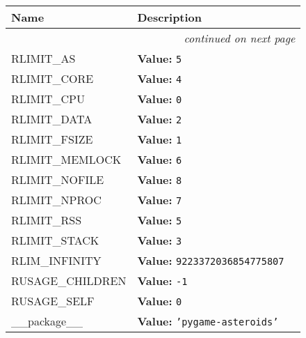     \vspace{-1cm}
\hspace{\varindent}\begin{longtable}{|p{\varnamewidth}|p{\vardescrwidth}|l}
\cline{1-2}
\cline{1-2} \centering \textbf{Name} & \centering \textbf{Description}& \\
\cline{1-2}
\endhead\cline{1-2}\multicolumn{3}{r}{\small\textit{continued on next page}}\\\endfoot\cline{1-2}
\endlastfoot\raggedright R\-L\-I\-M\-I\-T\-\_\-A\-S\- & \raggedright \textbf{Value:} 
{\tt 5}&\\
\cline{1-2}
\raggedright R\-L\-I\-M\-I\-T\-\_\-C\-O\-R\-E\- & \raggedright \textbf{Value:} 
{\tt 4}&\\
\cline{1-2}
\raggedright R\-L\-I\-M\-I\-T\-\_\-C\-P\-U\- & \raggedright \textbf{Value:} 
{\tt 0}&\\
\cline{1-2}
\raggedright R\-L\-I\-M\-I\-T\-\_\-D\-A\-T\-A\- & \raggedright \textbf{Value:} 
{\tt 2}&\\
\cline{1-2}
\raggedright R\-L\-I\-M\-I\-T\-\_\-F\-S\-I\-Z\-E\- & \raggedright \textbf{Value:} 
{\tt 1}&\\
\cline{1-2}
\raggedright R\-L\-I\-M\-I\-T\-\_\-M\-E\-M\-L\-O\-C\-K\- & \raggedright \textbf{Value:} 
{\tt 6}&\\
\cline{1-2}
\raggedright R\-L\-I\-M\-I\-T\-\_\-N\-O\-F\-I\-L\-E\- & \raggedright \textbf{Value:} 
{\tt 8}&\\
\cline{1-2}
\raggedright R\-L\-I\-M\-I\-T\-\_\-N\-P\-R\-O\-C\- & \raggedright \textbf{Value:} 
{\tt 7}&\\
\cline{1-2}
\raggedright R\-L\-I\-M\-I\-T\-\_\-R\-S\-S\- & \raggedright \textbf{Value:} 
{\tt 5}&\\
\cline{1-2}
\raggedright R\-L\-I\-M\-I\-T\-\_\-S\-T\-A\-C\-K\- & \raggedright \textbf{Value:} 
{\tt 3}&\\
\cline{1-2}
\raggedright R\-L\-I\-M\-\_\-I\-N\-F\-I\-N\-I\-T\-Y\- & \raggedright \textbf{Value:} 
{\tt 9223372036854775807}&\\
\cline{1-2}
\raggedright R\-U\-S\-A\-G\-E\-\_\-C\-H\-I\-L\-D\-R\-E\-N\- & \raggedright \textbf{Value:} 
{\tt -1}&\\
\cline{1-2}
\raggedright R\-U\-S\-A\-G\-E\-\_\-S\-E\-L\-F\- & \raggedright \textbf{Value:} 
{\tt 0}&\\
\cline{1-2}
\raggedright \_\-\_\-p\-a\-c\-k\-a\-g\-e\-\_\-\_\- & \raggedright \textbf{Value:} 
{\tt \texttt{'}\texttt{pygame-asteroids}\texttt{'}}&\\
\cline{1-2}
\end{longtable}


